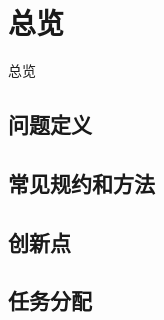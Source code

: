 \section{总览}
\begin{frame}{总览}
\end{frame}
\subsection{问题定义}

\subsection{常见规约和方法}

\subsection{创新点}

\subsection{任务分配}